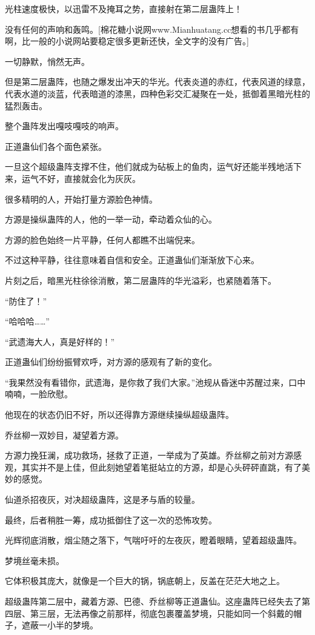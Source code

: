 \begin{this_body}
光柱速度极快，以迅雷不及掩耳之势，直接射在第二层蛊阵上！

没有任何的声响和轰鸣。[棉花糖小说网www.Mianhuatang.cc想看的书几乎都有啊，比一般的小说网站要稳定很多更新还快，全文字的没有广告。]

一切静默，悄然无声。

但是第二层蛊阵，也随之爆发出冲天的华光。代表炎道的赤红，代表风道的绿意，代表水道的淡蓝，代表暗道的漆黑，四种色彩交汇凝聚在一处，抵御着黑暗光柱的猛烈轰击。

整个蛊阵发出嘎吱嘎吱的响声。

正道蛊仙们各个面色紧张。

一旦这个超级蛊阵支撑不住，他们就成为砧板上的鱼肉，运气好还能半残地活下来，运气不好，直接就会化为灰灰。

很多精明的人，开始打量方源脸色神情。

方源是操纵蛊阵的人，他的一举一动，牵动着众仙的心。

方源的脸色始终一片平静，任何人都瞧不出端倪来。

不过这种平静，往往意味着自信和安全。正道蛊仙们渐渐放下心来。

片刻之后，暗黑光柱徐徐消散，第二层蛊阵的华光溢彩，也紧随着落下。

“防住了！”

“哈哈哈……”

“武遗海大人，真是好样的！”

正道蛊仙们纷纷振臂欢呼，对方源的感观有了新的变化。

“我果然没有看错你，武遗海，是你救了我们大家。”池规从昏迷中苏醒过来，口中喃喃，一脸欣慰。

他现在的状态仍旧不好，所以还得靠方源继续操纵超级蛊阵。

乔丝柳一双妙目，凝望着方源。

方源力挽狂澜，成功救场，拯救了正道，一举成为了英雄。乔丝柳之前对方源感观，其实并不是上佳，但此刻她望着笔挺站立的方源，却是心头砰砰直跳，有了美妙的感觉。

仙道杀招夜灰，对决超级蛊阵，这是矛与盾的较量。

最终，后者稍胜一筹，成功抵御住了这一次的恐怖攻势。

光辉彻底消散，烟尘随之落下，气喘吁吁的左夜灰，瞪着眼睛，望着超级蛊阵。

梦境丝毫未损。

它体积极其庞大，就像是一个巨大的锅，锅底朝上，反盖在茫茫大地之上。

超级蛊阵第二层中，藏着方源、巴德、乔丝柳等正道蛊仙。这座蛊阵已经失去了第四层、第三层，无法再像之前那样，彻底包裹覆盖梦境，只能如同一个斜戴的帽子，遮蔽一小半的梦境。


\end{this_body}
